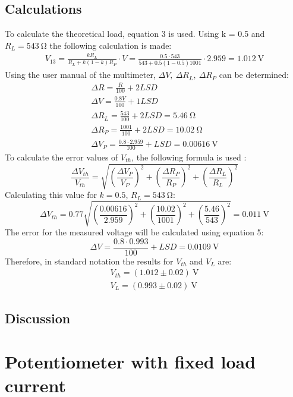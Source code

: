 \documentclass[a4paper]{article}
\newcommand{\unit}[1]{~\mathrm{#1}}
\begin{document}
\subsection{Calculations}
To calculate the theoretical load, equation 3 is used. Using k = 0.5 and $R_L =
543\unit{\Omega}$ the following calculation is made:
\begin{gather*}
    V_{13} = \frac{kR_L}{R_L + k(1-k) R_P} \cdot V = \frac{0.5 \cdot 543}{543 + 0.5(1-0.5)1001} \cdot 2.959 = 1.012\unit{V}
\end{gather*}
Using the user manual of the multimeter, $\Delta V, ~\Delta R_L, ~\Delta R_P$ can
be determined\cite{noauthor_am-500_2019}:
\begin{gather}
    \Delta R = \frac{R}{100} + 2LSD\\
    \Delta V = \frac{0.8 V}{100} + 1LSD\\
    \Delta R_L = \frac{543}{100} + 2LSD = 5.46\unit{\Omega} \nonumber \\
    \Delta R_P = \frac{1001}{100} + 2LSD = 10.02\unit{\Omega} \nonumber \\
    \Delta V_P = \frac{0.8 \cdot 2.959}{100} + LSD = 0.00616\unit{V} \nonumber
\end{gather} 
To calculate the error values of $V_{th}$, the following formula is used \cite{unc}:
\begin{equation}
    \frac{\Delta V_{th}}{V_{th}} = \sqrt{\left( \frac{\Delta V_P}{V_P}\right) ^2 + \left( \frac{\Delta R_P}{R_P} \right) ^ 2 + \left( \frac{\Delta R_L}{R_L} \right) ^2}
\end{equation}
Calculating this value for $k = 0.5$, $R_L = 543\unit{\Omega}$:
\[ \Delta V_{th} = 0.77 \sqrt{\left( \frac{0.00616}{2.959} \right) ^ 2 + \left(
\frac{10.02}{1001} \right) ^2 + \left(\frac{5.46}{543} \right) ^2 } = 0.011
\unit{V} \]
The error for the measured voltage will be calculated using equation 5:
\[ \Delta V = \frac{0.8 \cdot 0.993}{100} + LSD = 0.0109\unit{V} \]
Therefore, in standard notation the results for $V_{th}$ and $V_L$ are:
\begin{gather*}
    V_{th} = (1.012 \pm 0.02) \unit{V}\\
    V_L = (0.993 \pm 0.02) \unit{V}
\end{gather*}

\subsection{Discussion}

\section{Potentiometer with fixed load current}
\end{document}
